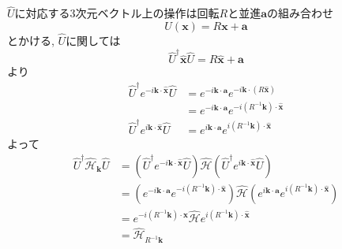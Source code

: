 \begin{theotcolorbox}[title = $\hat{U}$が時間反転操作を含まないとき]
    $\hat{U}$に対応する3次元ベクトル上の操作は回転$R$と並進$\bm{a}$の組み合わせ
    \begin{equation*}
        U(\bm{x}) = R\bm{x} + \bm{a}
    \end{equation*}
    とかける, $\hat{U}$に関しては
    \begin{equation*}
        \hat{U}^{\dagger} \hat{\bm{x}} \hat{U} = R\hat{\bm{x}} + \bm{a}
    \end{equation*}
    より
    \begin{align*}
        \hat{U}^{\dagger} e^{-i\bm{k}\cdot \hat{\bm{x}}} \hat{U} & = e^{-i\bm{k}\cdot \bm{a}} e^{-i\bm{k}\cdot (R \hat{\bm{x}})}\\
        & = e^{-i\bm{k}\cdot \bm{a}} e^{-i (R^{-1}\bm{k}) \cdot \hat{\bm{x}}}\\
        \hat{U}^{\dagger} e^{i\bm{k}\cdot \hat{\bm{x}}} \hat{U} & = e^{i\bm{k}\cdot \bm{a}} e^{i (R^{-1}\bm{k}) \cdot \hat{\bm{x}}}
    \end{align*}
    よって
    \begin{align*}
        \hat{U}^{\dagger} \hat{\mathcal{H}}_{\bm{k}} \hat{U} & = (\hat{U}^{\dagger} e^{-i\bm{k}\cdot \hat{\bm{x}}} \hat{U}) \hat{\mathcal{H}} (\hat{U}^{\dagger} e^{i\bm{k}\cdot \hat{\bm{x}}} \hat{U})\\
        & = (e^{-i\bm{k}\cdot \bm{a}} e^{-i (R^{-1}\bm{k}) \cdot \hat{\bm{x}}}) \hat{\mathcal{H}} (e^{i\bm{k}\cdot \bm{a}} e^{i (R^{-1}\bm{k}) \cdot \hat{\bm{x}}})\\
        & = e^{-i (R^{-1}\bm{k}) \cdot \hat{\bm{x}}} \hat{\mathcal{H}} e^{i (R^{-1}\bm{k}) \cdot \hat{\bm{x}}}\\
        & = \hat{\mathcal{H}}_{R^{-1}\bm{k}}
    \end{align*}
\end{theotcolorbox}

